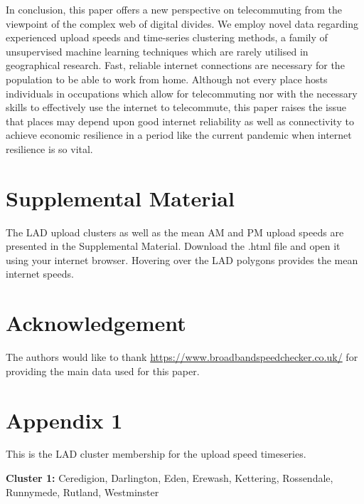 \documentclass[]{interact}
\theoremstyle{plain}%
\theoremstyle{definition}
\theoremstyle{remark}
\begin{document}
In conclusion, this paper offers a new perspective on telecommuting from
the viewpoint of the complex web of digital divides. We employ novel
data regarding experienced upload speeds and time-series clustering
methods, a family of unsupervised machine learning techniques which are
rarely utilised in geographical research. Fast, reliable internet
connections are necessary for the population to be able to work from
home. Although not every place hosts individuals in occupations which
allow for telecommuting nor with the necessary skills to effectively use
the internet to telecommute, this paper raises the issue that places may
depend upon good internet reliability as well as connectivity to achieve
economic resilience in a period like the current pandemic when internet
resilience is so vital.

\hypertarget{supplemental-material}{%
\section*{Supplemental Material}\label{supplemental-material}}

The LAD upload clusters as well as the mean AM and PM upload speeds are
presented in the Supplemental Material. Download the .html file and open
it using your internet browser. Hovering over the LAD polygons provides
the mean internet speeds.

\hypertarget{acknowledgement}{%
\section*{Acknowledgement}\label{acknowledgement}}

The authors would like to thank
\url{https://www.broadbandspeedchecker.co.uk/} for providing the main
data used for this paper.

\pagebreak

\hypertarget{appendix1}{%
\section*{Appendix 1}\label{appendix1}}

This is the LAD cluster membership for the upload speed timeseries.

\textbf{Cluster 1: } Ceredigion, Darlington, Eden, Erewash, Kettering,
Rossendale, Runnymede, Rutland, Westminster
\end{document}
